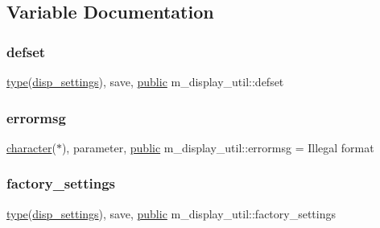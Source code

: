 \subsection{Variable Documentation}
\mbox{\label{namespacem__display__util_a94e5894dfc5e8a59b6ceac6721ae4f8e}} 
\subsubsection{\texorpdfstring{defset}{defset}}
{\footnotesize\ttfamily \hyperlink{stop__watch_83_8txt_a70f0ead91c32e25323c03265aa302c1c}{type}(\hyperlink{structm__display__util_1_1disp__settings}{disp\+\_\+settings}), save, \hyperlink{M__stopwatch_83_8txt_a2f74811300c361e53b430611a7d1769f}{public} m\+\_\+display\+\_\+util\+::defset}

\mbox{\label{namespacem__display__util_a844bf51463bbf006c07c60eb75a44051}} 
\subsubsection{\texorpdfstring{errormsg}{errormsg}}
{\footnotesize\ttfamily \hyperlink{option__stopwatch_83_8txt_abd4b21fbbd175834027b5224bfe97e66}{character}($\ast$), parameter, \hyperlink{M__stopwatch_83_8txt_a2f74811300c361e53b430611a7d1769f}{public} m\+\_\+display\+\_\+util\+::errormsg = \textquotesingle{}Illegal format\textquotesingle{}}

\mbox{\label{namespacem__display__util_a9ce4a22503d46c3cf4d1a054812827c0}} 
\subsubsection{\texorpdfstring{factory\+\_\+settings}{factory\_settings}}
{\footnotesize\ttfamily \hyperlink{stop__watch_83_8txt_a70f0ead91c32e25323c03265aa302c1c}{type}(\hyperlink{structm__display__util_1_1disp__settings}{disp\+\_\+settings}), save, \hyperlink{M__stopwatch_83_8txt_a2f74811300c361e53b430611a7d1769f}{public} m\+\_\+display\+\_\+util\+::factory\+\_\+settings}

